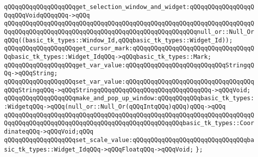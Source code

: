 \verb|qQQqqQQqqQQqqQQqqQQqget_selection_window_and_widget:qQQqqQQqqQQqqQQqqQQqqQQqVoidqQQqqQQq->qQQq|\newline
\verb|qQQqqQQqqQQqqQQqqQQqqQQqqQQqqQQqqQQqqQQqqQQqqQQqqQQqqQQqqQQqqQQqqQQqqQQqqQQqqQQqqQQqqQQqqQQqqQQqqQQqqQQqqQQqqQQqqQQqqQQqqQQqnull_or::Null_OrqQQq((basic_tk_types::Window_Id,qQQqbasic_tk_types::Widget_Id));|\newline
\verb|qQQqqQQqqQQqqQQqqQQqget_cursor_mark:qQQqqQQqqQQqqQQqqQQqqQQqqQQqqQQqqQQqbasic_tk_types::Widget_IdqQQq->qQQqbasic_tk_types::Mark;|\newline
\newline
\verb|qQQqqQQqqQQqqQQqqQQqget_var_value:qQQqqQQqqQQqqQQqqQQqqQQqqQQqStringqQQq->qQQqString;|\newline
\verb|qQQqqQQqqQQqqQQqqQQqset_var_value:qQQqqQQqqQQqqQQqqQQqqQQqqQQqqQQqqQQqqQQqStringqQQq->qQQqStringqQQqqQQqqQQqqQQqqQQqqQQqqQQqqQQq->qQQqVoid;|\newline
\newline
\verb|qQQqqQQqqQQqqQQqqQQqmake_and_pop_up_window:qQQqqQQqqQQqbasic_tk_types::WidgetqQQq->qQQq(null_or::Null_Or(qQQqIntqQQq)qQQq)qQQq->qQQq|\newline
\verb|qQQqqQQqqQQqqQQqqQQqqQQqqQQqqQQqqQQqqQQqqQQqqQQqqQQqqQQqqQQqqQQqqQQqqQQqqQQqqQQqqQQqqQQqqQQqqQQqqQQqqQQqqQQqqQQqqQQqqQQqbasic_tk_types::CoordinateqQQq->qQQqVoid;qQQq|\newline
\newline
\verb|qQQqqQQqqQQqqQQqqQQqset_scale_value:qQQqqQQqqQQqqQQqqQQqqQQqqQQqqQQqbasic_tk_types::Widget_IdqQQq->qQQqFloatqQQq->qQQqVoid;|\newline
\verb|};|\newline

